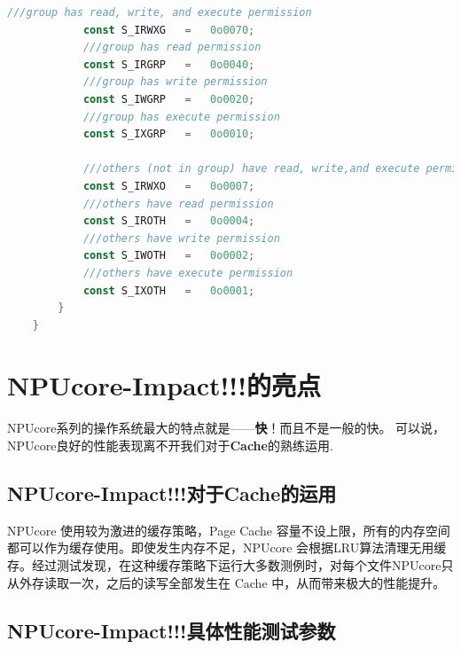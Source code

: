 \begin{lstlisting}[language={rust}, label={code:refill}, caption={FileDescriptor}]
            ///group has read, write, and execute permission
            const S_IRWXG   =   0o0070;
            ///group has read permission
            const S_IRGRP   =   0o0040;
            ///group has write permission
            const S_IWGRP   =   0o0020;
            ///group has execute permission
            const S_IXGRP   =   0o0010;

            ///others (not in group) have read, write,and execute permission
            const S_IRWXO   =   0o0007;
            ///others have read permission
            const S_IROTH   =   0o0004;
            ///others have write permission
            const S_IWOTH   =   0o0002;
            ///others have execute permission
            const S_IXOTH   =   0o0001;
        }
    }
\end{lstlisting}

\section{NPUcore-Impact!!!的亮点}

NPUcore系列的操作系统最大的特点就是——\textbf{快}！而且不是一般的快。
可以说，NPUcore良好的性能表现离不开我们对于\textbf{Cache}的熟练运用.

\subsection{NPUcore-Impact!!!对于Cache的运用}

NPUcore 使用较为激进的缓存策略，Page Cache 容量不设上限，所有的内存空间都可以作为缓存使用。即使发生内存不足，NPUcore 会根据LRU算法清理无用缓存。经过测试发现，在这种缓存策略下运行大多数测例时，对每个文件NPUcore只从外存读取一次，之后的读写全部发生在 Cache 中，从而带来极大的性能提升。

\subsection{NPUcore-Impact!!!具体性能测试参数}

